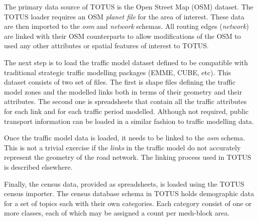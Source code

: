 
The primary data source of TOTUS is the Open Street Map (OSM) dataset. The TOTUS
loader requires an OSM \textit{planet file} for the area of interest. These data are then imported to the \textit{osm}  and \textit{network} schemas.  All routing edges (\textit{network}) are linked with their OSM counterparts to allow modifications of the OSM to used any other attributes or spatial features of interest to TOTUS.

The next step is to load the traffic model dataset defined to be compatible with traditional strategic traffic modelling packages (EMME, CUBE, etc). This dataset consists of two set of files. The first is shape files defining the traffic model zones and the modelled links both in terms of their geometry and their attributes. The second one is spreadsheets that contain all the traffic attributes for each link and for each traffic period modelled. Although not required, public transport information can be loaded in a similar fashion to traffic modelling data.

Once the traffic model data is loaded, it needs to be linked to the \textit{osm} schema. This is not a trivial exercise if the \textit{links} in the traffic model do not accurately represent the geometry of the road network. The linking process used in TOTUS is described elsewhere\cite{dummy_temp}. 

Finally, the census data, provided as spreadsheets, is loaded using the TOTUS census importer. The census
database schema in TOTUS holds demographic data for a set of topics
each with their own categories. Each category consist of one or more
classes, each of which may be assigned a count per mesh-block area.

